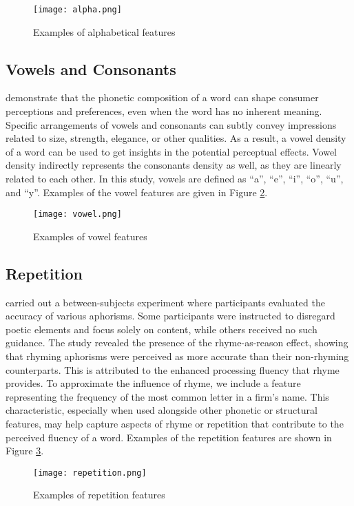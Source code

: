\documentclass[a4paper,11pt]{report}
\begin{document}
\begin{figure}[h!]
    \centering
    \texttt{[image: alpha.png]}
    \caption{Examples of alphabetical features}
    \label{fig:alpha}
\end{figure}

\subsection{Vowels and Consonants}
 demonstrate that the phonetic composition of a word can shape consumer perceptions and preferences, even when the word has no inherent meaning. Specific arrangements of vowels and consonants can subtly convey impressions related to size, strength, elegance, or other qualities. As a result, a vowel density of a word can be used to get insights in the  potential perceptual effects. Vowel density indirectly represents the consonants density as well, as they are linearly related to each other. In this study, vowels are defined as ``a'', ``e'', ``i'', ``o'', ``u'', and ``y''. Examples of the vowel features are given in Figure \ref{fig:vowel}.

\begin{figure}[h!]
    \centering
    \texttt{[image: vowel.png]}
    \caption{Examples of vowel features}
    \label{fig:vowel}
\end{figure}

\subsection{Repetition}
 carried out a between-subjects experiment where participants evaluated the accuracy of various aphorisms. Some participants were instructed to disregard poetic elements and focus solely on content, while others received no such guidance. The study revealed the presence of the rhyme-as-reason effect, showing that rhyming aphorisms were perceived as more accurate than their non-rhyming counterparts. This is attributed to the enhanced processing fluency that rhyme provides. To approximate the influence of rhyme, we include a feature representing the frequency of the most common letter in a firm's name. This characteristic, especially when used alongside other phonetic or structural features, may help capture aspects of rhyme or repetition that contribute to the perceived fluency of a word. Examples of the repetition features are shown in Figure \ref{fig:rep}.

\begin{figure}[h!]
    \centering
    \texttt{[image: repetition.png]}
    \caption{Examples of repetition features}
    \label{fig:rep}
\end{figure}
\end{document}
